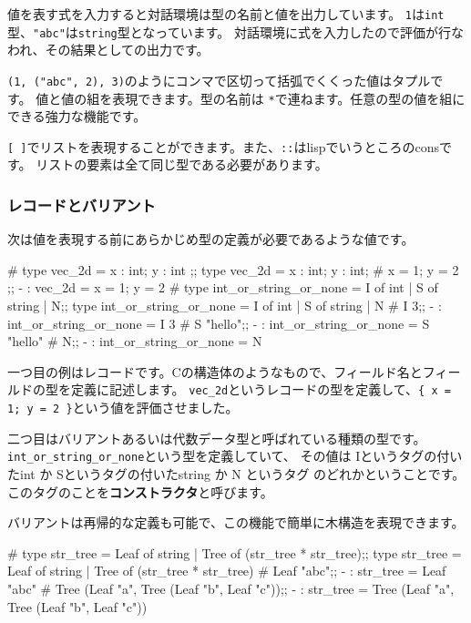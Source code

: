 \documentclass[mingoth,a4paper]{jsarticle}
\begin{document}
値を表す式を入力すると対話環境は型の名前と値を出力しています。
\verb|1|は\verb|int|型、\verb|"abc"|は\verb|string|型となっています。
対話環境に式を入力したので評価が行なわれ、その結果としての出力です。

\verb|(1, ("abc", 2), 3)|のようにコンマで区切って括弧でくくった値はタプルです。
値と値の組を表現できます。型の名前は \verb|*|で連ねます。任意の型の値を組にできる強力な機能です。

\verb|[ ]|でリストを表現することができます。また、\verb|::|はlispでいうところのconsです。
リストの要素は全て同じ型である必要があります。

\subsubsection{レコードとバリアント}

次は値を表現する前にあらかじめ型の定義が必要であるような値です。

\begin{commandline}
# type vec_2d = { x : int; y : int };;
type vec_2d = { x : int; y : int; }
# { x = 1; y = 2 };;
- : vec_2d = {x = 1; y = 2}
# type int_or_string_or_none = I of int | S of string | N;;
type int_or_string_or_none = I of int | S of string | N
# I 3;;
- : int_or_string_or_none = I 3
# S "hello";;
- : int_or_string_or_none = S "hello"
# N;;
- : int_or_string_or_none = N
\end{commandline}

一つ目の例はレコードです。Cの構造体のようなもので、フィールド名とフィールドの型を定義に記述します。
\verb|vec_2d|というレコードの型を定義して、\verb|{ x = 1; y = 2 }|という値を評価させました。

二つ目はバリアントあるいは代数データ型と呼ばれている種類の型です。
\verb|int_or_string_or_none|という型を定義していて、
その値は Iというタグの付いたint か Sというタグの付いたstring か N というタグ のどれかということです。
このタグのことを{\bf コンストラクタ}と呼びます。

バリアントは再帰的な定義も可能で、この機能で簡単に木構造を表現できます。

\begin{commandline}
# type str_tree = Leaf of string | Tree of (str_tree * str_tree);;
type str_tree = Leaf of string | Tree of (str_tree * str_tree)
# Leaf "abc";;
- : str_tree = Leaf "abc"
# Tree (Leaf "a", Tree (Leaf "b", Leaf "c"));;
- : str_tree = Tree (Leaf "a", Tree (Leaf "b", Leaf "c"))
\end{commandline}
\end{document}
